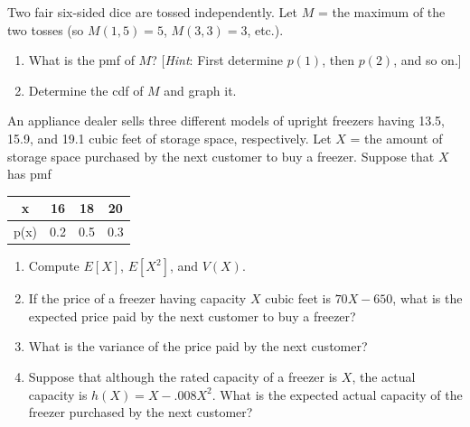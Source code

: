 \documentclass[11pt,letterpaper,boxed]{hmcpset}
\newcommand{\bk}[1]{\left[ #1 \right]}
\begin{document}
{\begin{solution}
	\vfill
\end{solution}
\newpage


\begin{problem}[3.2.18]
	Two fair six-sided dice are tossed independently. Let $M$ = the maximum of the two tosses (so $M(1,5) = 5$, $M(3,3) = 3$, etc.).
	\begin{enumerate}
		\item
			What is the pmf of $M$? [\textit{Hint}: First determine $p(1)$, then
$p(2)$, and so on.]
		\item
			Determine the cdf of $M$ and graph it.
	\end{enumerate}
\end{problem}

\begin{solution}
	\vfill
\end{solution}
\newpage


\begin{problem}[3.3.32]
	An appliance dealer sells three different models of upright freezers having 13.5, 15.9, and 19.1 cubic feet of storage space, respectively. Let $X$ = the amount of storage space purchased by the next customer to buy a freezer. Suppose that $X$ has pmf
	\begin{center}
		\begin{tabular}{c|c c c}
			x & 16 & 18 & 20\\
 			\hline
 			p(x) & 0.2 & 0.5 & 0.3 \\
	 	\end{tabular}
	\end{center}
	\begin{enumerate}
		\item
            Compute $E\bk{X}$, $E\bk{X^2}$, and $V(X)$.
		\item
			If the price of a freezer having capacity $X$ cubic feet is $70X - 650$, what is the expected price paid by the next customer to buy a freezer?
		\item
			What is the variance of the price paid by the next customer?
		\item
			Suppose that although the rated capacity of a freezer is $X$, the actual capacity is $h(X) = X - .008X^2$. What is the expected actual capacity of the freezer purchased by the next customer?
	\end{enumerate}
\end{problem}

}
\end{document}
